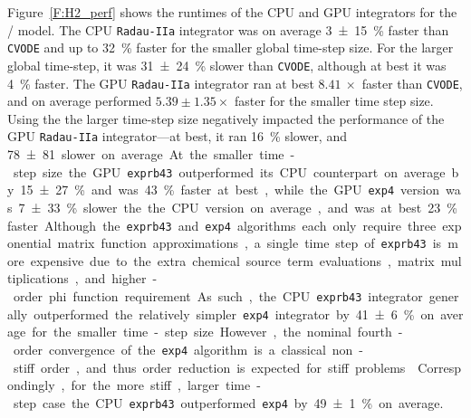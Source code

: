 \documentclass[preprint]{elsarticle}
\begin{document}
Figure~\ref{F:H2_perf} shows the runtimes of the CPU and GPU integrators for the \slash{} model.
The CPU \texttt{Radau-IIa} integrator was on average \SI{3\pm15}{\percent} faster than \texttt{CVODE} and up to \SI{32}{\percent} faster for the smaller global time-step size.
For the larger global time-step, it was \SI{31\pm24}{\percent} slower than \texttt{CVODE}, although at best it was \SI{4}{\percent} faster.
The GPU \texttt{Radau-IIa} integrator ran at best $\SI{8.41}{\times}$ faster than \texttt{CVODE}, and on average performed $5.39\pm1.35\times$ faster for the smaller time step size.
Using the the larger time-step size negatively impacted the performance of the GPU \texttt{Radau-IIa} integrator---at best, it ran \SI{16}{\percent} slower, and \SI{78\pm81} slower on average.
At the smaller time-step size the GPU \texttt{exprb43} outperformed its CPU counterpart on average by \SI{15\pm27}{\percent} and was \SI{43}{\percent} faster at best, while the GPU \texttt{exp4} version was \SI{7\pm33}{\percent} slower the the CPU version on average, and was at best \SI{23}{\percent} faster.
Although the \texttt{exprb43} and \texttt{exp4} algorithms each only require three exponential matrix function approximations, a single time step of \texttt{exprb43} is more expensive due to the extra chemical source term evaluations, matrix multiplications, and higher-order phi function requirement.
As such, the CPU \texttt{exprb43} integrator generally outperformed the relatively simpler \texttt{exp4} integrator by \SI{41\pm6}{\percent} on average for the smaller time-step size.
However, the nominal fourth-order convergence of the \texttt{exp4} algorithm is a classical non-stiff order, and thus order reduction is expected for stiff problems~\cite{ANU:7701740,Bisetti:2012jw}.
Correspondingly, for the more stiff, larger time-step case the CPU \texttt{exprb43} outperformed \texttt{exp4} by \SI{49\pm1}{\percent} on average.
\end{document}
